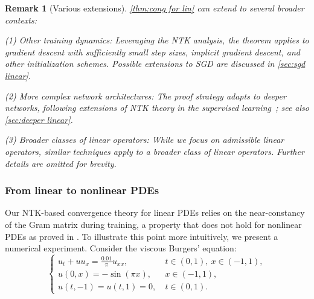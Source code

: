 \documentclass{article}
\newtheorem{remark}{Remark}
\newcommand{\T}{\mathsf{T}}
\begin{document}
\begin{remark}[Various extensions]
\cref{thm:cong for lin} can extend to several broader contexts: 

(1) \emph{Other training dynamics:} Leveraging the NTK analysis, the theorem applies to gradient descent with sufficiently small step sizes, implicit gradient descent, and other initialization schemes. 
Possible extensions to SGD are discussed in \cref{sec:sgd linear}.

(2) \emph{More complex network architectures:} The proof strategy adapts to deeper networks, following extensions of NTK theory in the supervised learning~\citep{du2018gradient}; see also \cref{sec:deeper linear}.

(3) \emph{Broader classes of linear operators:} While we focus on admissible linear operators, similar techniques apply to a broader class of linear operators. 
Further details are omitted for brevity.
\end{remark}

\subsubsection{From linear to nonlinear PDEs}\label{sec:from lin to non} 
Our NTK-based convergence theory for linear PDEs relies on the near-constancy of the Gram matrix during training, a property that does not hold for nonlinear PDEs as proved in \cite{bonfanti2024challenges}.
To illustrate this point more intuitively, we present a numerical experiment.
Consider the viscous Burgers' equation: 
\begin{equation}
    \begin{cases}
        u_{t}+uu_{x} = \frac{0.01}{\pi}u_{xx}, &\ t\in (0,1), \ x \in(-1,1), \\
        u(0,x) = -\sin(\pi x), &\ x \in (-1,1),\\
        u(t,-1) =  u(t,1) = 0, &\ t\in (0,1).\label{eq:Bur eq}
    \end{cases}   
\end{equation}
\end{document}
